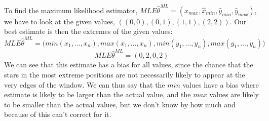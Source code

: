 To find the maximum likelihood estimator, $MLE\hat\theta^{ML} = (\hat x_{max}, \hat x_{min}, \hat y_{min},\hat y_{max})$, we have to look at the given values, $((0,0),(0,1),(1,1),(2,2))$. Our best estimate is then the extremes of the given values:
$$
MLE\hat\theta^{ML} = \Big( min(x_1,\dotsc,x_n), max(x_1,\dotsc,x_n), min(y_1,\dotsc,y_n), max(y_1,\dotsc,y_n) \Big)
$$
$$
MLE\hat\theta^{ML} = (0,2,0,2)
$$
We can see that this estimate has a bias for all values, since the chance that the stars in the most extreme positions are not necessarily likely to appear at the very edges of the window. We can thus say that the $min$ values have a bias where estimate is likely to be larger than the actual value, and the $max$ values are likely to be smaller than the actual values, but we don't know by how much and because of this can't correct for it.